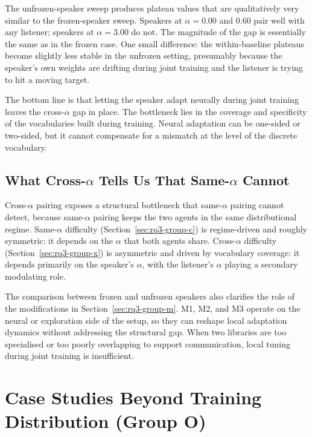 The unfrozen-speaker sweep produces plateau values that are qualitatively very similar to the frozen-speaker sweep. Speakers at $\alpha = 0.00$ and 0.60 pair well with any listener; speakers at $\alpha = 3.00$ do not. The magnitude of the gap is essentially the same as in the frozen case. One small difference: the within-baseline plateaus become slightly less stable in the unfrozen setting, presumably because the speaker's own weights are drifting during joint training and the listener is trying to hit a moving target.

The bottom line is that letting the speaker adapt neurally during joint training leaves the cross-$\alpha$ gap in place. The bottleneck lies in the coverage and specificity of the vocabularies built during training. Neural adaptation can be one-sided or two-sided, but it cannot compensate for a mismatch at the level of the discrete vocabulary.

\subsection{What Cross-$\alpha$ Tells Us That Same-$\alpha$ Cannot}
\label{sec:rq3-x-interpretation}

Cross-$\alpha$ pairing exposes a structural bottleneck that same-$\alpha$ pairing cannot detect, because same-$\alpha$ pairing keeps the two agents in the same distributional regime. Same-$\alpha$ difficulty (Section~\ref{sec:rq3-group-c}) is regime-driven and roughly symmetric: it depends on the $\alpha$ that both agents share. Cross-$\alpha$ difficulty (Section~\ref{sec:rq3-group-x}) is asymmetric and driven by vocabulary coverage: it depends primarily on the speaker's $\alpha$, with the listener's $\alpha$ playing a secondary modulating role.

The comparison between frozen and unfrozen speakers also clarifies the role of the modifications in Section~\ref{sec:rq3-group-m}. M1, M2, and M3 operate on the neural or exploration side of the setup, so they can reshape local adaptation dynamics without addressing the structural gap. When two libraries are too specialised or too poorly overlapping to support communication, local tuning during joint training is insufficient.

\section{Case Studies Beyond Training Distribution (Group O)}
\label{sec:rq3-group-o}

